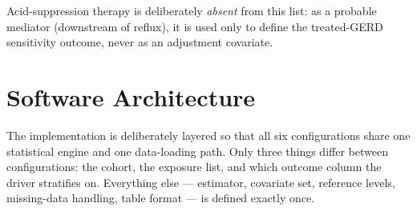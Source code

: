 \documentclass[11pt]{article}
\begin{document}
\noindent Acid-suppression therapy is deliberately \emph{absent} from this list: as a probable mediator
(downstream of reflux), it is used only to define the treated-GERD sensitivity outcome, never as an
adjustment covariate.

\section{Software Architecture}
\label{sec:arch}
The implementation is deliberately layered so that all six configurations share one statistical engine
and one data-loading path. Only three things differ between configurations: the cohort, the exposure
list, and which outcome column the driver stratifies on. Everything else --- estimator, covariate set,
reference levels, missing-data handling, table format --- is defined exactly once.
\end{document}
